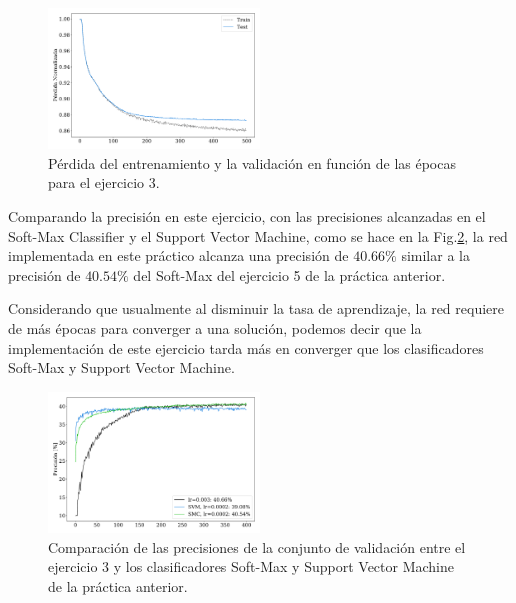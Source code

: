 \begin{figure}[H]
    \begin{small}
        \begin{center}
            \includegraphics[width=0.5\textwidth]{Graphs/ejer3_loss.pdf}
        \end{center}
        \caption{Pérdida del entrenamiento y la  validación en función de las épocas para el  ejercicio 3.}
        \label{fig:ejer3_loss}
    \end{small}
\end{figure}

Comparando la precisión en este ejercicio, con las precisiones alcanzadas en el Soft-Max Classifier y el Support Vector Machine, como se hace en la Fig.\ref{fig:ejer3_acc_all}, la red implementada en este práctico alcanza una precisión de $40.66\%$ similar a la precisión de $40.54\%$ del Soft-Max  del ejercicio 5 de la práctica anterior. 

Considerando que usualmente al disminuir la tasa de aprendizaje, la red requiere de más épocas para converger a una solución, podemos decir que la implementación de este ejercicio tarda más en converger que los clasificadores Soft-Max y Support Vector Machine.

\begin{figure}[H]
    \begin{small}
        \begin{center}
            \includegraphics[width=0.5\textwidth]{Graphs/ejer3_acc_all.pdf}
        \end{center}
        \caption{Comparación de las precisiones de la conjunto de validación entre el ejercicio 3 y los clasificadores Soft-Max y Support Vector Machine de la práctica anterior.}
        \label{fig:ejer3_acc_all}
    \end{small}
\end{figure}


